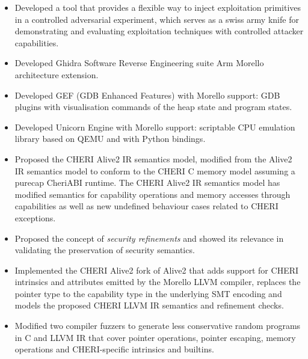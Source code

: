 \documentclass{resume}
\begin{document}
\begin{itemize}
  \item Developed a tool that provides a flexible way to inject exploitation primitives in a controlled adversarial experiment, which serves as a swiss army knife for demonstrating and evaluating exploitation techniques with controlled attacker capabilities.
\end{itemize}

\begin{itemize}
  \item Developed Ghidra Software Reverse Engineering suite Arm Morello architecture extension.
  \item Developed GEF (GDB Enhanced Features) with Morello support: GDB plugins with visualisation commands of the heap state and program states.
  \item Developed Unicorn Engine with Morello support: scriptable CPU emulation library based on QEMU and with Python bindings.
\end{itemize}

\begin{itemize}
  \item Proposed the CHERI Alive2 IR semantics model, modified from the Alive2 IR semantics model to conform to the CHERI C memory model assuming a purecap CheriABI runtime. The CHERI Alive2 IR semantics model has modified semantics for capability operations and memory accesses through capabilities as well as new undefined behaviour cases related to CHERI exceptions.
  \item Proposed the concept of \textit{security refinements} and showed its relevance in validating the preservation of security semantics. 
  \item Implemented the CHERI Alive2 fork of Alive2 that adds support for CHERI intrinsics and attributes emitted by the Morello LLVM compiler, replaces the pointer type to the capability type in the underlying SMT encoding and models the proposed CHERI LLVM IR semantics and refinement checks. 
  \item Modified two compiler fuzzers to generate less conservative random programs in C and LLVM IR that cover pointer operations, pointer escaping, memory operations and CHERI-specific intrinsics and builtins.
\end{itemize}
\end{document}
